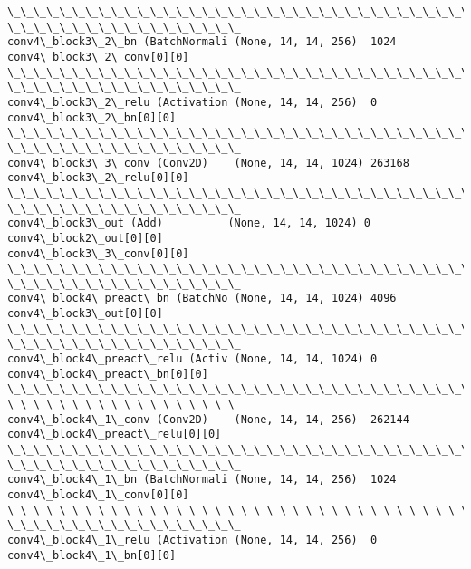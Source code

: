 \documentclass[11pt]{article}
\begin{document}
\begin{Verbatim}[commandchars=\\\{\}]
\_\_\_\_\_\_\_\_\_\_\_\_\_\_\_\_\_\_\_\_\_\_\_\_\_\_\_\_\_\_\_\_\_\_\_\_\_\_\_\_\_\_\_\_\_\_\_\_\_\_\_\_\_\_\_\_\_\_\_\_\_\_\_\_\_\_\_\_\_\_\_\_\_\_\_\_\_\_\_\_
\_\_\_\_\_\_\_\_\_\_\_\_\_\_\_\_\_\_
conv4\_block3\_2\_bn (BatchNormali (None, 14, 14, 256)  1024
conv4\_block3\_2\_conv[0][0]
\_\_\_\_\_\_\_\_\_\_\_\_\_\_\_\_\_\_\_\_\_\_\_\_\_\_\_\_\_\_\_\_\_\_\_\_\_\_\_\_\_\_\_\_\_\_\_\_\_\_\_\_\_\_\_\_\_\_\_\_\_\_\_\_\_\_\_\_\_\_\_\_\_\_\_\_\_\_\_\_
\_\_\_\_\_\_\_\_\_\_\_\_\_\_\_\_\_\_
conv4\_block3\_2\_relu (Activation (None, 14, 14, 256)  0
conv4\_block3\_2\_bn[0][0]
\_\_\_\_\_\_\_\_\_\_\_\_\_\_\_\_\_\_\_\_\_\_\_\_\_\_\_\_\_\_\_\_\_\_\_\_\_\_\_\_\_\_\_\_\_\_\_\_\_\_\_\_\_\_\_\_\_\_\_\_\_\_\_\_\_\_\_\_\_\_\_\_\_\_\_\_\_\_\_\_
\_\_\_\_\_\_\_\_\_\_\_\_\_\_\_\_\_\_
conv4\_block3\_3\_conv (Conv2D)    (None, 14, 14, 1024) 263168
conv4\_block3\_2\_relu[0][0]
\_\_\_\_\_\_\_\_\_\_\_\_\_\_\_\_\_\_\_\_\_\_\_\_\_\_\_\_\_\_\_\_\_\_\_\_\_\_\_\_\_\_\_\_\_\_\_\_\_\_\_\_\_\_\_\_\_\_\_\_\_\_\_\_\_\_\_\_\_\_\_\_\_\_\_\_\_\_\_\_
\_\_\_\_\_\_\_\_\_\_\_\_\_\_\_\_\_\_
conv4\_block3\_out (Add)          (None, 14, 14, 1024) 0
conv4\_block2\_out[0][0]
conv4\_block3\_3\_conv[0][0]
\_\_\_\_\_\_\_\_\_\_\_\_\_\_\_\_\_\_\_\_\_\_\_\_\_\_\_\_\_\_\_\_\_\_\_\_\_\_\_\_\_\_\_\_\_\_\_\_\_\_\_\_\_\_\_\_\_\_\_\_\_\_\_\_\_\_\_\_\_\_\_\_\_\_\_\_\_\_\_\_
\_\_\_\_\_\_\_\_\_\_\_\_\_\_\_\_\_\_
conv4\_block4\_preact\_bn (BatchNo (None, 14, 14, 1024) 4096
conv4\_block3\_out[0][0]
\_\_\_\_\_\_\_\_\_\_\_\_\_\_\_\_\_\_\_\_\_\_\_\_\_\_\_\_\_\_\_\_\_\_\_\_\_\_\_\_\_\_\_\_\_\_\_\_\_\_\_\_\_\_\_\_\_\_\_\_\_\_\_\_\_\_\_\_\_\_\_\_\_\_\_\_\_\_\_\_
\_\_\_\_\_\_\_\_\_\_\_\_\_\_\_\_\_\_
conv4\_block4\_preact\_relu (Activ (None, 14, 14, 1024) 0
conv4\_block4\_preact\_bn[0][0]
\_\_\_\_\_\_\_\_\_\_\_\_\_\_\_\_\_\_\_\_\_\_\_\_\_\_\_\_\_\_\_\_\_\_\_\_\_\_\_\_\_\_\_\_\_\_\_\_\_\_\_\_\_\_\_\_\_\_\_\_\_\_\_\_\_\_\_\_\_\_\_\_\_\_\_\_\_\_\_\_
\_\_\_\_\_\_\_\_\_\_\_\_\_\_\_\_\_\_
conv4\_block4\_1\_conv (Conv2D)    (None, 14, 14, 256)  262144
conv4\_block4\_preact\_relu[0][0]
\_\_\_\_\_\_\_\_\_\_\_\_\_\_\_\_\_\_\_\_\_\_\_\_\_\_\_\_\_\_\_\_\_\_\_\_\_\_\_\_\_\_\_\_\_\_\_\_\_\_\_\_\_\_\_\_\_\_\_\_\_\_\_\_\_\_\_\_\_\_\_\_\_\_\_\_\_\_\_\_
\_\_\_\_\_\_\_\_\_\_\_\_\_\_\_\_\_\_
conv4\_block4\_1\_bn (BatchNormali (None, 14, 14, 256)  1024
conv4\_block4\_1\_conv[0][0]
\_\_\_\_\_\_\_\_\_\_\_\_\_\_\_\_\_\_\_\_\_\_\_\_\_\_\_\_\_\_\_\_\_\_\_\_\_\_\_\_\_\_\_\_\_\_\_\_\_\_\_\_\_\_\_\_\_\_\_\_\_\_\_\_\_\_\_\_\_\_\_\_\_\_\_\_\_\_\_\_
\_\_\_\_\_\_\_\_\_\_\_\_\_\_\_\_\_\_
conv4\_block4\_1\_relu (Activation (None, 14, 14, 256)  0
conv4\_block4\_1\_bn[0][0]

\end{Verbatim}
\end{document}
